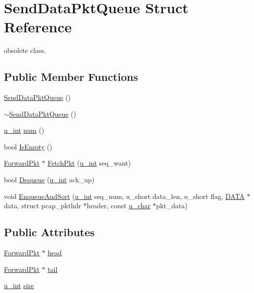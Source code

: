 \hypertarget{structSendDataPktQueue}{\section{\-Send\-Data\-Pkt\-Queue \-Struct \-Reference}
\label{structSendDataPktQueue}
}


obsolete class.  


\subsection*{\-Public \-Member \-Functions}
\begin{DoxyCompactItemize}
\item 
\hyperlink{structSendDataPktQueue_a4808fd86d996d456ca1a217dcb81e32f}{\-Send\-Data\-Pkt\-Queue} ()
\item 
\hyperlink{structSendDataPktQueue_a36bf54b5797a930a95d78b46121f02ae}{$\sim$\-Send\-Data\-Pkt\-Queue} ()
\item 
\hyperlink{split__tcp__gateway_8h_ac319c165d52643e43249fe003e18bdf3}{u\-\_\-int} \hyperlink{structSendDataPktQueue_a8c2f66d0b6a9fc1e0c6f5e915aed4379}{num} ()
\item 
bool \hyperlink{structSendDataPktQueue_a056b059590a77ab32a5c7a90693c9021}{\-Is\-Empty} ()
\item 
\hyperlink{structForwardPkt}{\-Forward\-Pkt} $\ast$ \hyperlink{structSendDataPktQueue_acba0111fe87e80f0f6742adbe5bcf804}{\-Fetch\-Pkt} (\hyperlink{split__tcp__gateway_8h_ac319c165d52643e43249fe003e18bdf3}{u\-\_\-int} seq\-\_\-want)
\item 
bool \hyperlink{structSendDataPktQueue_a1898832da23110391da825aabe136d35}{\-Dequeue} (\hyperlink{split__tcp__gateway_8h_ac319c165d52643e43249fe003e18bdf3}{u\-\_\-int} ack\-\_\-up)
\item 
void \hyperlink{structSendDataPktQueue_a623a20c1be65b612e958d5d1512c3528}{\-Enqueue\-And\-Sort} (\hyperlink{split__tcp__gateway_8h_ac319c165d52643e43249fe003e18bdf3}{u\-\_\-int} seq\-\_\-num, u\-\_\-short data\-\_\-len, u\-\_\-short flag, \hyperlink{structDATA}{\-D\-A\-T\-A} $\ast$data, struct pcap\-\_\-pkthdr $\ast$header, const \hyperlink{split__tcp__gateway_8h_ae2b02ed168fc99cff3851603910b1fb6}{u\-\_\-char} $\ast$pkt\-\_\-data)
\end{DoxyCompactItemize}
\subsection*{\-Public \-Attributes}
\begin{DoxyCompactItemize}
\item 
\hyperlink{structForwardPkt}{\-Forward\-Pkt} $\ast$ \hyperlink{structSendDataPktQueue_a746bc373bcb50b940dc9b4a7008734f7}{head}
\item 
\hyperlink{structForwardPkt}{\-Forward\-Pkt} $\ast$ \hyperlink{structSendDataPktQueue_add57d3f96d46372714ede0f7f61e9a4f}{tail}
\item 
\hyperlink{split__tcp__gateway_8h_ac319c165d52643e43249fe003e18bdf3}{u\-\_\-int} \hyperlink{structSendDataPktQueue_a38d4786f413d2c08b00db9de7fa6841f}{size}
\end{DoxyCompactItemize}


